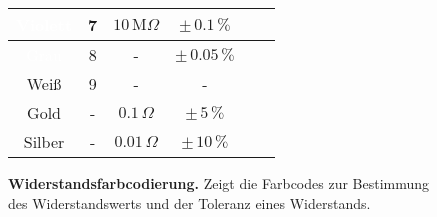 {\begin{figure}[H]
\begin{minipage}[b]{1\textwidth}
{\begin{tabular}{|c|c|c|c|c|c|}
					\hline %
					\cellcolor{violet}\textcolor{white}{Violett}  & 7                      & $10\,\text{M}\Omega$   & $\pm\, 0.1\,\%$   \\ %
					\hline %
					\cellcolor{gray}\textcolor{white}{Grau}       & 8                      & -                      & $\pm\, 0.05\,\%$  \\ %
					\hline %
					Weiß                                          & 9                      & -                      & -                 \\ %
					\hline %
					\cellcolor{gold}Gold                          & -                      & $0.1\,\Omega$          & $\pm\,5\,\%$      \\ %
					\hline %
					\cellcolor{silver}Silber                      & -                      & $0.01\,\Omega$         & $\pm\,10\,\%$     \\ %
					\hline %
				\end{tabular}%
			}
		\end{minipage}
		\caption{\textbf{Widerstandsfarbcodierung.} Zeigt die Farbcodes zur Bestimmung des Widerstandswerts und der Toleranz eines Widerstands.}
		\label{fig:Farbkodierung vom Widerstand}
	\end{figure}
	
}%




